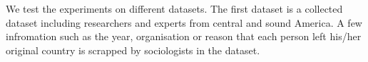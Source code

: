 We test the experiments on  different datasets.  The first dataset is a collected dataset including   researchers and experts from central and sound America. A few infromation such as the year, organisation or reason that each person left his/her original country is scrapped by sociologists in the dataset.